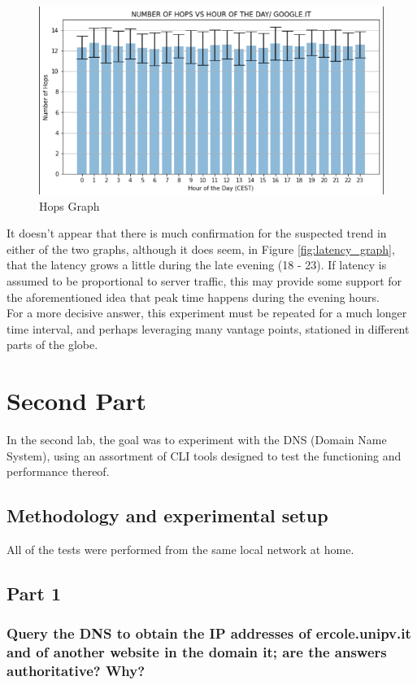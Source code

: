 \documentclass[a4paper,10pt]{article}
\begin{document}
\begin{figure}[h!]
\centering
\includegraphics[scale=0.4]{hops_graph}
\caption{Hops Graph}
\label{fig:hops_graph}
\end{figure}


It doesn't appear that there is much confirmation for the suspected trend in either of the  two graphs, although it does seem, in Figure \ref{fig:latency_graph}, that the latency grows a little during the late evening (18 - 23). If latency is assumed to be proportional to server traffic, this may provide some support for the aforementioned idea that peak time happens during the evening hours.\\

For a more decisive answer, this experiment must be repeated for a much longer time interval, and perhaps leveraging many vantage points, stationed in different parts of the globe.

\section{Second Part}
In the second lab, the goal was to experiment with the DNS (Domain Name System), using an assortment of CLI tools designed to test the functioning and performance thereof.

\subsection{Methodology and experimental setup}
All of the tests were performed from the same local network at home.

\subsection{Part 1}

\subsubsection{Query the DNS to obtain the IP addresses of ercole.unipv.it and of another website in the domain it; are the answers authoritative? Why?}
\end{document}
